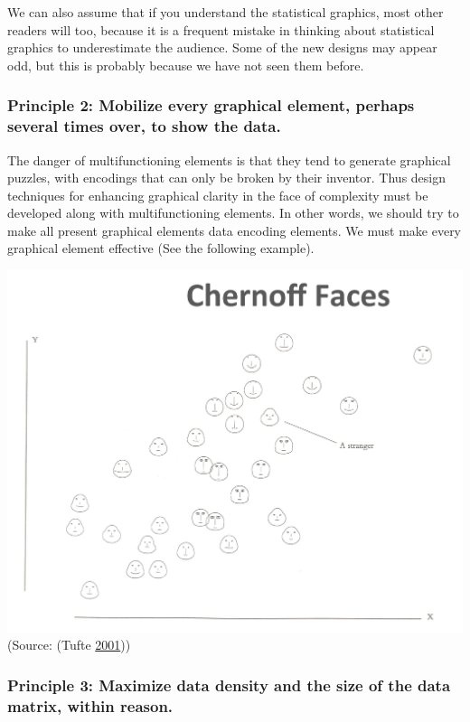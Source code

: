 \documentclass[]{book}
\begin{document}
We can also assume that if you understand the statistical graphics, most
other readers will too, because it is a frequent mistake in thinking
about statistical graphics to underestimate the audience. Some of the
new designs may appear odd, but this is probably because we have not
seen them before.

\subsubsection{Principle 2: Mobilize every graphical element, perhaps
several times over, to show the
data.}\label{principle-2-mobilize-every-graphical-element-perhaps-several-times-over-to-show-the-data.}

The danger of multifunctioning elements is that they tend to generate
graphical puzzles, with encodings that can only be broken by their
inventor. Thus design techniques for enhancing graphical clarity in the
face of complexity must be developed along with multifunctioning
elements. In other words, we should try to make all present graphical
elements data encoding elements. We must make every graphical element
effective (See the following example).

\includegraphics{images/Tufte_figure6.png} (Source: (Tufte
\protect\hyperlink{ref-Tufte_2001}{2001}))

\subsubsection{Principle 3: Maximize data density and the size of the
data matrix, within
reason.}\label{principle-3-maximize-data-density-and-the-size-of-the-data-matrix-within-reason.}
\end{document}
